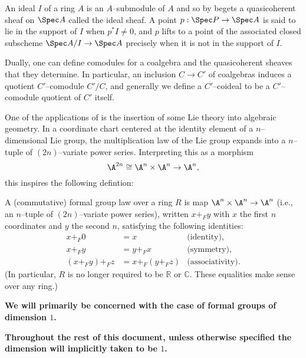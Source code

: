 \begin{example}
An ideal $I$ of a ring $A$ is an $A$--submodule of $A$ and so by  begets a quasicoherent sheaf on $\Spec A$ called the ideal sheaf.  A point $p: \Spec P \to \Spec A$ is said to lie in the support of $I$ when $p^* I \ne 0$, and $p$ lifts to a point of the associated closed subscheme $\Spec A/I \to \Spec A$ precisely when it is not in the support of $I$.
\end{example}

\begin{example}\label{DefnCoideal}
Dually, one can define comodules for a coalgebra and the quasicoherent sheaves that they determine.  In particular, an inclusion $C \to C'$ of coalgebras induces a quotient $C'$--comodule $C' / C$, and generally we define a $C'$--coideal to be a $C'$--comodule quotient of $C'$ itself.
\end{example}





\label{FormalLieGroups}

One of the applications of  is the insertion of some Lie theory into algebraic geometry.  In a coordinate chart centered at the identity element of a $n$--dimensional Lie group, the multiplication law of the Lie group expands into a $n$--tuple of $(2n)$--variate power series.  Interpreting this as a morphism \[\A^{2n} \cong \A^n \times \A^n \to \A^n,\] this inspires the following defintion:
\begin{definition}\label{DefinitionOfDimension}
A (commutative) formal group law over a ring $R$ is map $\A^n \times \A^n \to \A^n$ (i.e., an $n$--tuple of $(2n)$--variate power series), written $x +_F y$ with $x$ the first $n$ coordinates and $y$ the second $n$, satisfying the following identities:
\begin{align*}
x +_F 0 & = x & \text{(identity)}, \\
x +_F y & = y +_F x & \text{(symmetry)}, \\
(x +_F y) +_F z & = x +_F (y +_F z) & \text{(associativity)}.
\end{align*}
(In particular, $R$ is no longer required to be $\mathbb{R}$ or $\mathbb C$. These equalities make sense over any ring.)
\end{definition}

\begin{center}
\textbf{We will primarily be concerned with the case of formal groups of dimension $1$.}

\textbf{Throughout the rest of this document, unless otherwise specified the dimension will implicitly taken to be $1$.}
\end{center}


